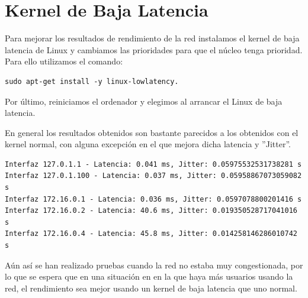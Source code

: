 \section{Kernel de Baja Latencia}

Para mejorar los resultados de rendimiento de la red instalamos el kernel de baja latencia de Linux y cambiamos las prioridades para que el núcleo tenga prioridad. Para ello utilizamos el comando:
\begin{verbatim}
sudo apt-get install -y linux-lowlatency.
\end{verbatim}
Por último, reiniciamos el ordenador y elegimos al arrancar el Linux de baja latencia.

En general los resultados obtenidos son bastante parecidos a los obtenidos con el kernel normal, con alguna excepción en el que mejora dicha latencia y ''Jitter''. 

\begin{lstlisting}[caption={Salida del fichero python que calcula retardos entre interfaces con kernel de baja latencia.}]
Interfaz 127.0.1.1 - Latencia: 0.041 ms, Jitter: 0.05975532531738281 s
Interfaz 127.0.1.100 - Latencia: 0.037 ms, Jitter: 0.05958867073059082 s
Interfaz 172.16.0.1 - Latencia: 0.036 ms, Jitter: 0.0597078800201416 s
Interfaz 172.16.0.2 - Latencia: 40.6 ms, Jitter: 0.019350528717041016 s
Interfaz 172.16.0.4 - Latencia: 45.8 ms, Jitter: 0.014258146286010742 s
\end{lstlisting}

Aún así se han realizado pruebas cuando la red no estaba muy congestionada, por lo que se espera que en una situación en en la que haya más usuarios usando la red, el rendimiento sea mejor usando un kernel de baja latencia que uno normal. 

